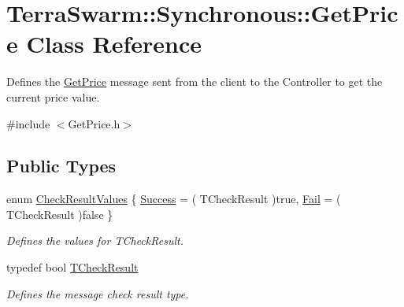 \hypertarget{class_terra_swarm_1_1_synchronous_1_1_get_price}{\section{Terra\-Swarm\-:\-:Synchronous\-:\-:Get\-Price Class Reference}
\label{class_terra_swarm_1_1_synchronous_1_1_get_price}
}


Defines the \hyperlink{class_terra_swarm_1_1_synchronous_1_1_get_price}{Get\-Price} message sent from the client to the Controller to get the current price value.  




{\ttfamily \#include $<$Get\-Price.\-h$>$}

\subsection*{Public Types}
\begin{DoxyCompactItemize}
\item 
enum \hyperlink{class_terra_swarm_1_1_synchronous_1_1_get_price_ace12fb126447b011bb7f0e39522e3798}{Check\-Result\-Values} \{ \hyperlink{class_terra_swarm_1_1_synchronous_1_1_get_price_ace12fb126447b011bb7f0e39522e3798aa6e8d01a11a6e2d19be5074d6ab3e779}{Success} = ( T\-Check\-Result )true, 
\hyperlink{class_terra_swarm_1_1_synchronous_1_1_get_price_ace12fb126447b011bb7f0e39522e3798a5b3330fb077085ae5fae8509ffcf64c8}{Fail} = ( T\-Check\-Result )false
 \}
\begin{DoxyCompactList}\small\item\em Defines the values for T\-Check\-Result. \end{DoxyCompactList}\item 
typedef bool \hyperlink{class_terra_swarm_1_1_synchronous_1_1_get_price_a174c0399b878132f69b36c99ec7a09b4}{T\-Check\-Result}
\begin{DoxyCompactList}\small\item\em Defines the message check result type. \end{DoxyCompactList}\end{DoxyCompactItemize}
